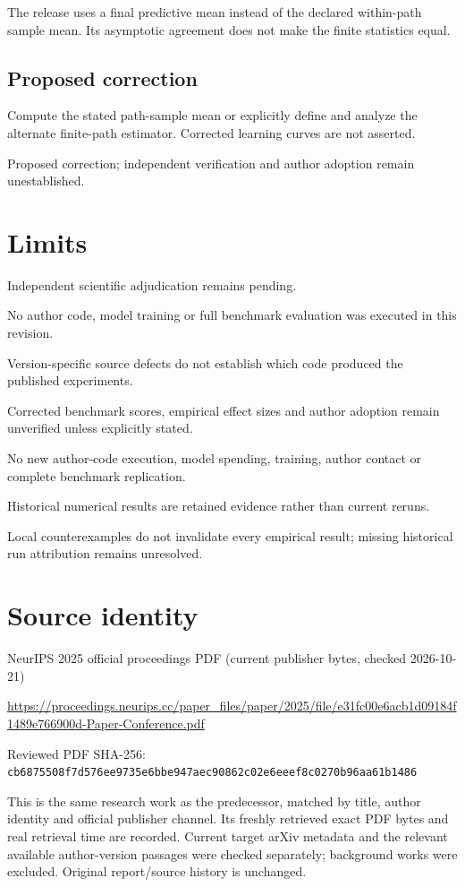 \documentclass[11pt]{article}
\begin{document}
The release uses a final predictive mean instead of the declared within-path sample mean. Its asymptotic agreement does not make the finite statistics equal.

\subsection*{Proposed correction}

Compute the stated path-sample mean or explicitly define and analyze the alternate finite-path estimator. Corrected learning curves are not asserted.

Proposed correction; independent verification and author adoption remain unestablished.

\section*{Limits}

Independent scientific adjudication remains pending.\par

No author code, model training or full benchmark evaluation was executed in this revision.\par

Version-specific source defects do not establish which code produced the published experiments.\par

Corrected benchmark scores, empirical effect sizes and author adoption remain unverified unless explicitly stated.\par

No new author-code execution, model spending, training, author contact or complete benchmark replication.\par

Historical numerical results are retained evidence rather than current reruns.\par

Local counterexamples do not invalidate every empirical result; missing historical run attribution remains unresolved.\par

\section*{Source identity}

NeurIPS 2025 official proceedings PDF (current publisher bytes, checked 2026-10-21)

\url{https://proceedings.neurips.cc/paper_files/paper/2025/file/e31fc00e6acb1d09184f1489e766900d-Paper-Conference.pdf}

Reviewed PDF SHA-256: \nolinkurl{cb6875508f7d576ee9735e6bbe947aec90862c02e6eeef8c0270b96aa61b1486}

This is the same research work as the predecessor, matched by title, author identity and official publisher channel. Its freshly retrieved exact PDF bytes and real retrieval time are recorded. Current target arXiv metadata and the relevant available author-version passages were checked separately; background works were excluded. Original report/source history is unchanged.
\end{document}
